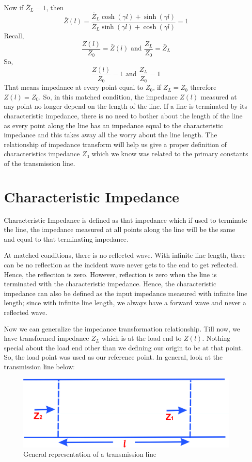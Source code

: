 Now if $\bar{Z}_L = 1$, then 
\begin{dmath*}
\bar{Z}(l) = {\frac{\bar{Z}_L\cosh(\gamma l) + \sinh(\gamma l)}{\bar{Z}_L\sinh(\gamma l) + \cosh(\gamma l)}} = 1
\end{dmath*}
Recall,
\[\frac{Z(l)}{Z_0} = \bar{Z}(l)\text{ and }\frac{Z_L}{Z_0} = \bar{Z}_L\]
So,
\[\frac{Z(l)}{Z_0} = 1\text{ and }\frac{Z_L}{Z_0} = 1
\]
That means impedance at every point equal to $Z_0$, if $Z_L = Z_0$ therefore $Z(l) = Z_0$. So, in this matched condition, the impedance $Z(l)$ measured at any point no longer depend on the length of the line. If a line is terminated by its characteristic impedance, there is no need to bother about the length of the line as every point along the line has an impedance equal to the characteristic impedance and this takes away all the worry about the line length.
The relationship of impedance transform will help us give a proper definition of characteristics impedance $Z_0$ which we know was related to the primary constants of the transmission line.

\section{Characteristic Impedance}  
Characteristic Impedance is defined as that impedance which if used to terminate the line, the impedance measured at all points along the line will be the same and equal to that terminating impedance.

At matched conditions, there is no reflected wave. With infinite line length, there can be no reflection as the incident wave never gets to the end to get reflected. Hence, the reflection is zero. However, reflection is zero when the line is terminated with the characteristic impedance. Hence, the characteristic impedance can also be defined as the input impedance measured with infinite line length; since with infinite line length, we always have a forward wave and never a reflected wave.

Now we can generalize the impedance transformation relationship. Till now, we have transformed impedance $Z_L$ which is at the load end to $Z(l)$. Nothing special about the load end other than we defining our origin to be at that point. So, the load point was used as our reference point. In general, look at the transmission line below:
\begin{figure}[h]
\centering
\includegraphics[scale=0.45]{./graphics/1234}
\caption{General representation of a transmission line}
\end{figure}

